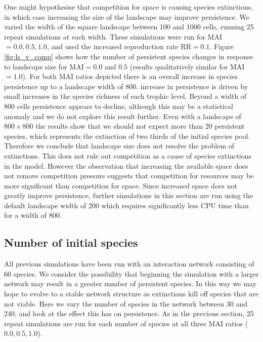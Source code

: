 One might hypothesise that competition for space is causing species extinctions, in which case increasing the size of the landscape may improve persistence. We varied the width of the square landscape between 100 and 1000 cells, running 25 repeat simulations at each width. These simulations were run for MAI$=0.0,0.5,1.0$, and used the increased reproduction rate RR$=0.1$. Figure \ref{fig:ls_v_comp} shows how the number of persistent species changes in response to landscape size for MAI$=0.0$ and $0.5$ (results qualitatively similar for MAI$=1.0$). For both MAI ratios depicted there is an overall increase in species persistence up to a landscape width of 800.  increase in persistence is driven by small increases in the species richness of each trophic level. Beyond a width of 800 cells persistence appears to decline, although this may be a statistical anomaly and we do not explore this result further. Even with a landscape of $800 \times 800$ the results show that we should not expect more than 20 persistent species, which represents the extinction of two thirds of the initial species pool. Therefore we conclude that landscape size does not resolve the problem of extinctions. This does not rule out competition as a cause of species extinctions in the model. However the observation that increasing the available space does not remove competition pressure suggests that competition for resources may be more significant than competition for space. Since increased space does not greatly improve persistence, further simulations in this section are run using the default landscape width of 200 which requires significantly less CPU time than for a width of 800.

\subsection{Number of initial species}
\label{sec:numsp_vp}

All previous simulations have been run with an interaction network consisting of 60 species. We consider the possibility that beginning the simulation with a larger network may result in a greater number of persistent species. In this way we may hope to evolve to a stable network structure as extinctions kill off species that are not viable. Here we vary the number of species in the network between 30 and 240, and look at the effect this has on persistence. As in the previous section, 25 repeat simulations are run for each number of species at all three MAI ratios ($0.0,0.5,1.0$).
 
